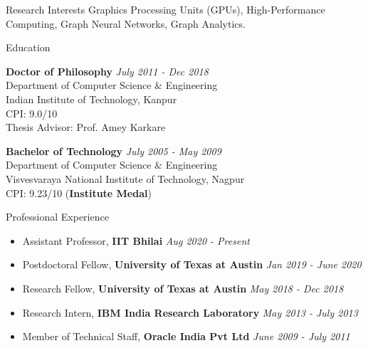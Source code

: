 \documentclass{resume} %
\begin{document}

\begin{rSection}{Research Interests}
	Graphics Processing Units (GPUs), High-Performance Computing, Graph Neural Networks, Graph Analytics.
\end{rSection}


\begin{rSection}{Education}

{\bf Doctor of Philosophy} \hfill {\em July 2011 - Dec 2018} \\ 
Department of Computer Science \& Engineering \\
Indian Institute of Technology, Kanpur \\
CPI: 9.0/10 \\
Thesis Advisor: Prof. Amey Karkare

{\bf Bachelor of Technology} \hfill {\em July 2005 - May 2009}  \\
Department of Computer Science \& Engineering \\
Visvesvaraya National Institute of Technology, Nagpur \\
CPI: 9.23/10 (\textbf{Institute Medal})

\end{rSection}


\begin{rSection}{Professional Experience}
	\begin{itemize}
		\item Assistant Professor, \textbf{IIT Bhilai} \hfill {\em Aug 2020 - Present}
		\item Postdoctoral Fellow, \textbf{University of Texas at Austin}  \hfill {\em Jan 2019 - June 2020}
		\item Research Fellow, \textbf{University of Texas at Austin} \hfill{\em May 2018 - Dec 2018}
		\item Research Intern, \textbf{IBM India Research Laboratory} \hfill{\em May 2013 - July 2013}
		\item Member of Technical Staff, \textbf{Oracle India Pvt Ltd} \hfill{\em June 2009 - July 2011}
	\end{itemize}
\end{rSection}
\end{document}
